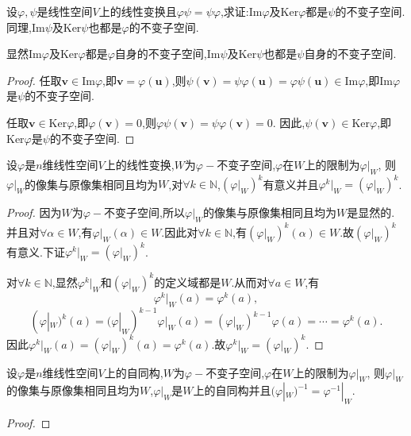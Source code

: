 \documentclass[../../main.tex]{subfiles}%
\begin{document}
\begin{proposition}\label{proposition:乘法可交换的线性变换值域和核互为不变子空间}
设\(\varphi,\psi\)是线性空间\(V\)上的线性变换且\(\varphi\psi = \psi\varphi\),求证:\(\text{Im}\varphi\)及\(\text{Ker}\varphi\)都是\(\psi\)的不变子空间.同理,\(\text{Im}\psi\)及\(\text{Ker}\psi\)也都是\(\varphi\)的不变子空间.
\end{proposition}
\begin{note}
显然\(\text{Im}\varphi\)及\(\text{Ker}\varphi\)都是\(\varphi\)自身的不变子空间,\(\text{Im}\psi\)及\(\text{Ker}\psi\)也都是\(\psi\)自身的不变子空间.
\end{note}
\begin{proof}
任取\(\boldsymbol{v}\in\text{Im}\varphi\),即\(\boldsymbol{v}=\varphi(\boldsymbol{u})\),则\(\psi(\boldsymbol{v})=\psi\varphi(\boldsymbol{u})=\varphi\psi(\boldsymbol{u})\in\text{Im}\varphi\),即\(\text{Im}\varphi\)是\(\psi\)的不变子空间.

任取\(\boldsymbol{v}\in\text{Ker}\varphi\),即\(\varphi(\boldsymbol{v}) = 0\),则\(\varphi\psi(\boldsymbol{v})=\psi\varphi(\boldsymbol{v}) = 0\). 因此,\(\psi(\boldsymbol{v})\in\text{Ker}\varphi\),即\(\text{Ker}\varphi\)是\(\psi\)的不变子空间.
\end{proof}

\begin{proposition}\label{proposition:线性变换在其不变子空间下的限制}
设\(\varphi\)是\(n\)维线性空间\(V\)上的线性变换,\(W\)为\(\varphi -\)不变子空间,\(\varphi\)在\(W\)上的限制为\(\varphi|_W\),
则\(\varphi|_W\)的像集与原像集相同且均为\(W\),对\(\forall k\in \mathbb{N}\),\((\varphi|_W)^k\)有意义并且\(\varphi^k|_W = (\varphi|_W)^k\).    
\end{proposition}
\begin{proof}
因为\(W\)为\(\varphi -\)不变子空间,所以\(\varphi|_W\)的像集与原像集相同且均为\(W\)是显然的.
并且对\(\forall \alpha \in W\),有\(\varphi|_W(\alpha) \in W\).因此对\(\forall k \in \mathbb{N}\),有\((\varphi|_W)^k(\alpha) \in W\).故\((\varphi|_W)^k\)有意义.下证\(\varphi^k|_W = (\varphi|_W)^k\).

对\(\forall k\in \mathbb{N}\),显然\(\varphi^k|_W\)和\((\varphi|_W)^k\)的定义域都是\(W\).从而对\(\forall a\in W\),有
\[
\varphi^k|_W(a)=\varphi^k(a),
\]
\[
(\varphi|_W)^k(a)=(\varphi|_W)^{k - 1}\varphi|_W(a)=(\varphi|_W)^{k - 1}\varphi(a)=\cdots=\varphi^k(a).
\]
因此\(\varphi^k|_W(a)=(\varphi|_W)^k(a)=\varphi^k(a)\).故\(\varphi^k|_W = (\varphi|_W)^k\).
\end{proof}

\begin{proposition}\label{proposition:自同构在其不变子空间下的限制}
设\(\varphi\)是\(n\)维线性空间\(V\)上的自同构,\(W\)为\(\varphi -\)不变子空间,\(\varphi\)在\(W\)上的限制为\(\varphi|_W\),
则\(\varphi|_W\)的像集与原像集相同且均为\(W\),\(\varphi|_W\)是\(W\)上的自同构并且\((\varphi|_W)^{-1} = \varphi^{-1}|_W\).
\end{proposition}
\begin{proof}

\end{proof}
\end{document}
